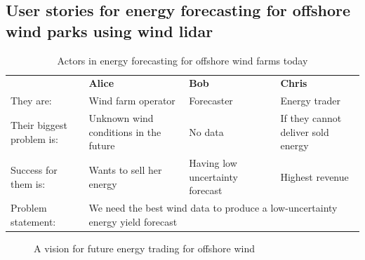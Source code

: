 \subsection*{User stories for energy forecasting for offshore wind parks using wind lidar}

\begin{table}[!h]
 \centering
 \caption{Actors in energy forecasting for offshore wind farms today}
 \begin{tabular}{@{}|p{}|p{}|p{}|p{}|@{}}
 \rowcolor{Task32Blue2} & \textbf{Alice} & \textbf{Bob} & \textbf{Chris}  \\
They are: & 
    Wind farm operator & 
    Forecaster & 
    Energy trader \\
Their biggest problem is: & 
    Unknown wind conditions in the future & 
    No data & 
    If they cannot deliver sold energy \\
Success for them is: & 
    Wants to sell her energy & 
    Having low uncertainty forecast & 
    Highest revenue \\
Problem statement: & 
    \multicolumn{3}{|p{0.765\textwidth+4\tabcolsep+2\arrayrulewidth}|}{We need the best wind data to produce a low-uncertainty energy yield forecast}\\
\end{tabular}
\label{tab:02_offshoreforecasting_now}
\end{table}


\begin{figure}[!h]
    \centering
    \caption{A vision for future energy trading for offshore wind}
    \label{fig:02_offshoreforecasting_future}
\end{figure}
